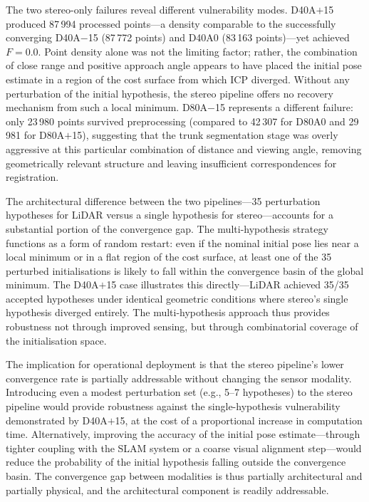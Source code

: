 The two stereo-only failures reveal different vulnerability modes. D40A$+$15 produced 87\,994 processed points---a density comparable to the successfully converging D40A$-$15 (87\,772 points) and D40A0 (83\,163 points)---yet achieved $F = 0.0$. Point density alone was not the limiting factor; rather, the combination of close range and positive approach angle appears to have placed the initial pose estimate in a region of the cost surface from which ICP diverged. Without any perturbation of the initial hypothesis, the stereo pipeline offers no recovery mechanism from such a local minimum. D80A$-$15 represents a different failure: only 23\,980 points survived preprocessing (compared to 42\,307 for D80A0 and 29\,981 for D80A$+$15), suggesting that the trunk segmentation stage was overly aggressive at this particular combination of distance and viewing angle, removing geometrically relevant structure and leaving insufficient correspondences for registration.

The architectural difference between the two pipelines---35 perturbation hypotheses for LiDAR versus a single hypothesis for stereo---accounts for a substantial portion of the convergence gap. The multi-hypothesis strategy functions as a form of random restart: even if the nominal initial pose lies near a local minimum or in a flat region of the cost surface, at least one of the 35 perturbed initialisations is likely to fall within the convergence basin of the global minimum. The D40A$+$15 case illustrates this directly---LiDAR achieved 35/35 accepted hypotheses under identical geometric conditions where stereo's single hypothesis diverged entirely. The multi-hypothesis approach thus provides robustness not through improved sensing, but through combinatorial coverage of the initialisation space.

The implication for operational deployment is that the stereo pipeline's lower convergence rate is partially addressable without changing the sensor modality. Introducing even a modest perturbation set (e.g., 5--7 hypotheses) to the stereo pipeline would provide robustness against the single-hypothesis vulnerability demonstrated by D40A$+$15, at the cost of a proportional increase in computation time. Alternatively, improving the accuracy of the initial pose estimate---through tighter coupling with the SLAM system or a coarse visual alignment step---would reduce the probability of the initial hypothesis falling outside the convergence basin. The convergence gap between modalities is thus partially architectural and partially physical, and the architectural component is readily addressable.

